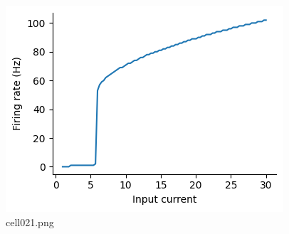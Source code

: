 \begin{figure}[ht]
	\centering
	\includegraphics[scale=0.8, max width=\linewidth]{./fig/neuron-model/hodgkin-huxley/cell021.png}
	\caption{cell021.png}
	\label{cell021.png}
\end{figure}
